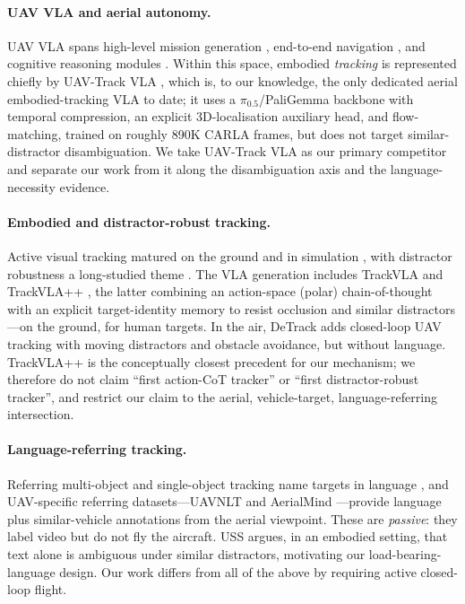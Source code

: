\documentclass[11pt]{article}
\begin{document}
\paragraph{UAV VLA and aerial autonomy.}
UAV VLA spans high-level mission generation \citep{uavvla}, end-to-end
navigation \citep{aerialvla,vlaan}, and cognitive reasoning modules
\citep{cognitivedrone}. Within this space, embodied \emph{tracking} is
represented chiefly by UAV-Track VLA \citep{uavtrackvla}, which is, to our
knowledge, the only dedicated aerial embodied-tracking VLA to date; it uses
a $\pi_{0.5}$/PaliGemma backbone with temporal compression, an explicit
3D-localisation auxiliary head, and flow-matching, trained on roughly 890K
CARLA frames, but does not target similar-distractor disambiguation. We take
UAV-Track VLA as our primary competitor and separate our work from it along
the disambiguation axis and the language-necessity evidence.

\paragraph{Embodied and distractor-robust tracking.}
Active visual tracking matured on the ground and in simulation
\citep{advat,empoweringevt}, with distractor robustness a long-studied
theme \citep{distractionrobust}. The VLA generation includes TrackVLA
\citep{trackvla} and TrackVLA++ \citep{trackvlapp}, the latter combining an
action-space (polar) chain-of-thought with an explicit target-identity
memory to resist occlusion and similar distractors---on the ground, for
human targets. In the air, DeTrack \citep{detrack} adds closed-loop UAV
tracking with moving distractors and obstacle avoidance, but without
language. TrackVLA++ is the conceptually closest precedent for our
mechanism; we therefore do not claim ``first action-CoT tracker'' or ``first
distractor-robust tracker'', and restrict our claim to the aerial,
vehicle-target, language-referring intersection.

\paragraph{Language-referring tracking.}
Referring multi-object and single-object tracking name targets in language
\citep{rmot}, and UAV-specific referring datasets---UAVNLT \citep{uavnlt}
and AerialMind \citep{aerialmind}---provide language plus similar-vehicle
annotations from the aerial viewpoint. These are \emph{passive}: they label
video but do not fly the aircraft. USS \citep{uss} argues, in an embodied
setting, that text alone is ambiguous under similar distractors, motivating
our load-bearing-language design. Our work differs from all of the above by
requiring active closed-loop flight.
\end{document}
